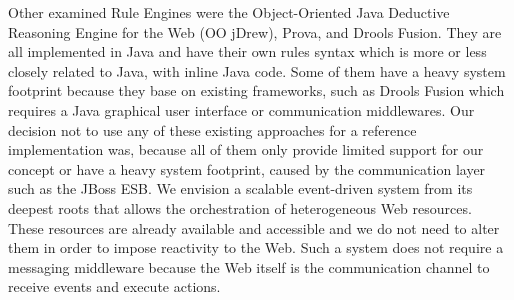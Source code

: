 Other examined Rule Engines were the \textrm{Object-Oriented Java Deductive Reasoning Engine for the Web} (\textrm{OO jDrew}), \textrm{Prova}, and \textrm{Drools Fusion}.
They are all implemented in \textrm{Java} and have their own rules syntax which is more or less closely related to \textrm{Java}, with inline \textrm{Java} code.
Some of them have a heavy system footprint because they base on existing frameworks, such as \textrm{Drools Fusion} which requires a Java graphical user interface or communication middlewares.
Our decision not to use any of these existing approaches for a reference implementation was, because all of them only provide limited support for our concept or have a heavy system footprint, caused by the communication layer such as the {JBoss ESB}.
We envision a scalable event-driven system from its deepest roots that allows the orchestration of heterogeneous Web resources.
These resources are already available and accessible and we do not need to alter them in order to impose reactivity to the Web.
Such a system does not require a messaging middleware because the Web itself is the communication channel to receive events and execute actions.


